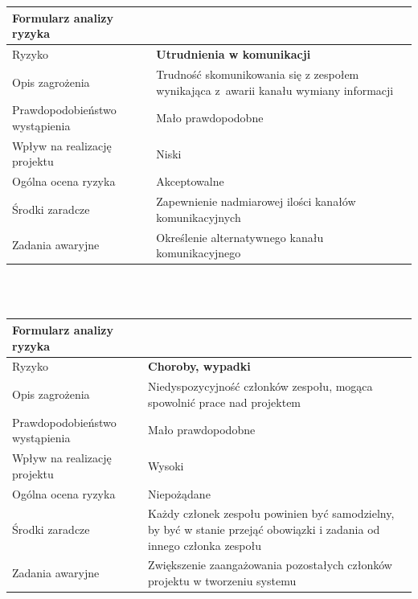 \documentclass{article}
\begin{document}
\mbox{}\\\mbox{}\\

{\def\arraystretch{1.3}\tabcolsep=10pt
\begin{tabular}{|L{6cm}|L{9cm}|}
\hline
Formularz analizy ryzyka &  \\
\hline
Ryzyko 						   & \textbf{Utrudnienia w komunikacji} \\
\hline
Opis zagrożenia				   & Trudność skomunikowania się z zespołem wynikająca z~awarii kanału wymiany informacji \\
\hline
Prawdopodobieństwo wystąpienia & Mało prawdopodobne \\
\hline
Wpływ na realizację projektu   & Niski \\
\hline
Ogólna ocena ryzyka   & Akceptowalne \\
\hline
Środki zaradcze				   & Zapewnienie nadmiarowej ilości kanałów komunikacyjnych \\
\hline
Zadania awaryjne			   & Określenie alternatywnego kanału komunikacyjnego \\
\hline
\end{tabular}}

\mbox{}\\\mbox{}\\

{\def\arraystretch{1.3}\tabcolsep=10pt
\begin{tabular}{|L{6cm}|L{9cm}|}
\hline
Formularz analizy ryzyka &  \\
\hline
Ryzyko 						   & \textbf{Choroby, wypadki} \\
\hline
Opis zagrożenia				   & Niedyspozycyjność członków zespołu, mogąca spowolnić prace nad projektem \\
\hline
Prawdopodobieństwo wystąpienia & Mało prawdopodobne \\
\hline
Wpływ na realizację projektu   & Wysoki \\
\hline
Ogólna ocena ryzyka   & Niepożądane \\
\hline
Środki zaradcze				   & Każdy członek zespołu powinien być samodzielny, by być w stanie przejąć obowiązki i zadania od innego członka zespołu \\
\hline
Zadania awaryjne			   & Zwiększenie zaangażowania pozostałych członków projektu w tworzeniu systemu \\
\hline
\end{tabular}}

\mbox{}\\\mbox{}\\
\end{document}
